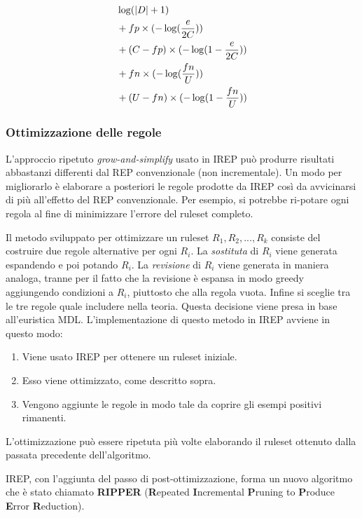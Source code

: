 \begin{align*}
	&\log(|D| + 1) \\
	&+ fp \times (-\log(\dfrac{e}{2C})) \\
	&+ (C - fp) \times (-\log(1 - \-\dfrac{e}{2C})) \\
	&+ fn \times (-\log(\dfrac{fn}{U})) \\
	&+ (U - fn) \times (-\log(1 - \dfrac{fn}{U})) \\	
\end{align*}


\subsubsection*{Ottimizzazione delle regole}
L'approccio ripetuto \textit{grow-and-simplify} usato in IREP può produrre risultati abbastanzi differenti dal REP convenzionale (non incrementale). Un modo per migliorarlo è elaborare a posteriori le regole prodotte da IREP così da avvicinarsi di più all'effetto del REP convenzionale. Per esempio, si potrebbe ri-potare ogni regola al fine di minimizzare l'errore del ruleset completo.

Il metodo sviluppato per ottimizzare un ruleset $R_1,R_2,...,R_k$ consiste del costruire due regole alternative per ogni $R_i$. La \textit{sostituta} di $R_i$ viene generata espandendo e poi potando $R_i$. La \textit{revisione} di $R_i$ viene generata in maniera analoga, tranne per il fatto che la revisione è espansa in modo greedy aggiungendo condizioni a $R_i$, piuttosto che alla regola vuota. Infine si sceglie tra le tre regole quale includere nella teoria. Questa decisione viene presa in base all'euristica MDL. L'implementazione di questo metodo in IREP avviene in questo modo:
\begin{enumerate}
	\item Viene usato IREP per ottenere un ruleset iniziale.
	\item Esso viene ottimizzato, come descritto sopra.
	\item Vengono aggiunte le regole in modo tale da coprire gli esempi positivi rimanenti.
\end{enumerate}

L'ottimizzazione può essere ripetuta più volte elaborando il ruleset ottenuto dalla passata precedente dell'algoritmo.

IREP, con l'aggiunta del passo di post-ottimizzazione, forma un nuovo algoritmo che è stato chiamato \textbf{RIPPER} (\textbf{R}epeated \textbf{I}ncremental \textbf{P}runing to \textbf{P}roduce \textbf{E}rror \textbf{R}eduction).

